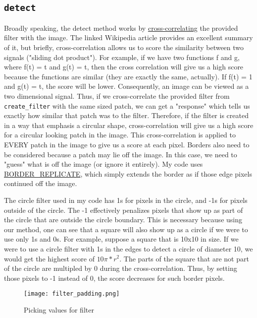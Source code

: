 \documentclass[11pt]{article}
\begin{document}
\subsection{\texttt{detect}}
Broadly speaking, the detect method works by \href{http://en.wikipedia.org/wiki/Cross-correlation}{cross-correlating} the provided filter with the image.  The linked Wikipedia article provides an excellent summary of it, but briefly, cross-correlation allows us to score the similarity between two signals ("sliding dot product").  For example, if we have two functions f and g, where f(t) = t and g(t) = t, then the cross correlation will give us a high score because the functions are similar (they are exactly the same, actually).  If f(t) = 1 and g(t) = t, the score will be lower.  Consequently, an image can be viewed as a two dimensional signal.  Thus, if we cross-correlate the provided filter from \texttt{create\_filter} with the same sized patch, we can get a "response" which tells us exactly how similar that patch was to the filter.  Therefore, if the filter is created in a way that emphasis a circular shape, cross-correlation will give us a high score for a circular looking patch in the image.  This cross-correlation is applied to EVERY patch in the image to give us a score at each pixel.  Borders also need to be considered because a patch  may lie off the image.  In this case, we need to "guess" what is off the image (or ignore it entirely).  My code uses \href{http://docs.opencv.org/modules/imgproc/doc/filtering.html#void filter2D(InputArray src, OutputArray dst, int ddepth, InputArray kernel, Point anchor, double delta, int borderType)}{BORDER\_REPLICATE}, which simply extends the border as if those edge pixels continued off the image.

The circle filter used in my code has 1s for pixels in the circle, and -1s for pixels outside of the circle.  The -1 effectively penalizes pixels that show up as part of the circle that are outside the circle boundary.  This is necessary because using our method,  one can see that a square will also show up as a circle if we were to use only 1s and 0s.  For example, suppose a square that is 10x10 in size.  If we were to use a circle filter with 1s in the edges to detect a circle of diameter 10, we would get the highest score of \(10 \pi *r^2\).  The parts of the square that are not part of the circle are multipled by 0 during the cross-correlation.  Thus, by setting those pixels to -1 instead of 0, the score decreases for such border pixels.

\begin{figure}[h]
\caption{Picking values for filter}
\texttt{[image: filter\_padding.png]}
\end{figure}
\end{document}
